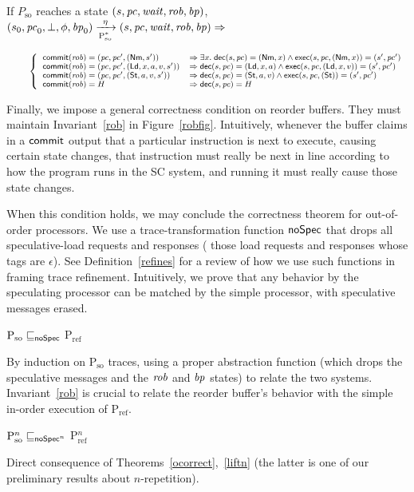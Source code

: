\begin{figure*}[t]
\begin{inv}
If $P_\text{so}$ reaches a state $(s, \pc, \wait, \rob, \ppc)$, \ie{}\hspace{.2cm}
$\io{P$_\text{so}^{*}$}{s_0,\pc_0,\bot,\phi,\ppc_0}{s,\pc,\wait,\rob,\ppc}{\eta} \Rightarrow$

\begin{math}
\small
\;\;\;\;\;\;\;\;\left\{
\begin{array}{ll}
\commit(\rob) = (\pc, \pc', (\nm, s')) &\Rightarrow
\exists x. \; \dec(s,\pc) = (\nm, x) \wedge \exec(s,\pc, (\nm,x)) =
(s',\pc')\\
\commit(\rob) = (\pc, \pc', (\ld, x, a, v, s')) & \Rightarrow
\dec(s,\pc) = (\ld, x,a) \wedge \exec(s,\pc, (\ld,x,v)) = (s',\pc')\\
\commit(\rob) = (\pc, \pc', (\st, a, v, s')) &\Rightarrow
\dec(s,\pc) = (\st, a,v) \wedge \exec(s,\pc, (\st)) =
(s',\pc')\\
\commit(\rob) = H & \Rightarrow
\dec(s, \pc) = H\\
\end{array}
\right.\end{math}
\label{rob}
\end{inv}
\vspace{-.5cm}
\caption{Correctness of reorder buffer}
\label{robfig}
\end{figure*}

Finally, we impose a general correctness condition on reorder
buffers.  They must maintain Invariant~\ref{rob} in Figure~\ref{robfig}.
Intuitively, whenever the buffer claims in a $\commit$
output that a particular instruction is next to execute, causing
certain state changes, that instruction must really be next in line according
to how the program runs in the SC system, and running it must really cause
those state changes.

When this condition holds, we may conclude the correctness theorem for
out-of-order processors.  We use a trace-transformation function
$\noSpec$ that drops all speculative-load requests and responses (\ie{} those load requests and responses whose tags are $\epsilon$).
See Definition~\ref{refines} for a review of how we use such
functions in framing trace refinement.  Intuitively, we prove that any
behavior by the speculating processor can be matched by the simple
processor, with speculative messages erased.
\begin{theorem}
\label{ocorrect}
$\text{P$_\text{so}$} \sqsubseteq_\noSpec$ P$_\text{ref}$
\end{theorem}
\begin{prf}
By induction on P$_\text{so}$ traces, using a proper abstraction
function (which drops the speculative messages and the $\rob$ and $\ppc$ states) to relate the two systems.  Invariant~\ref{rob} is crucial to
relate the reorder buffer's behavior with the simple in-order
execution of P$_\text{ref}$.
\end{prf}

\begin{corollary}
\label{ges}
$\text{P$^n_\text{so}$} \sqsubseteq_{\noSpec^n}$ P$_\text{ref}^n$
\end{corollary}
\begin{prf}
Direct consequence of Theorems~\ref{ocorrect},~\ref{liftn} (the
latter is one of our preliminary results about $n$-repetition).
\end{prf}

